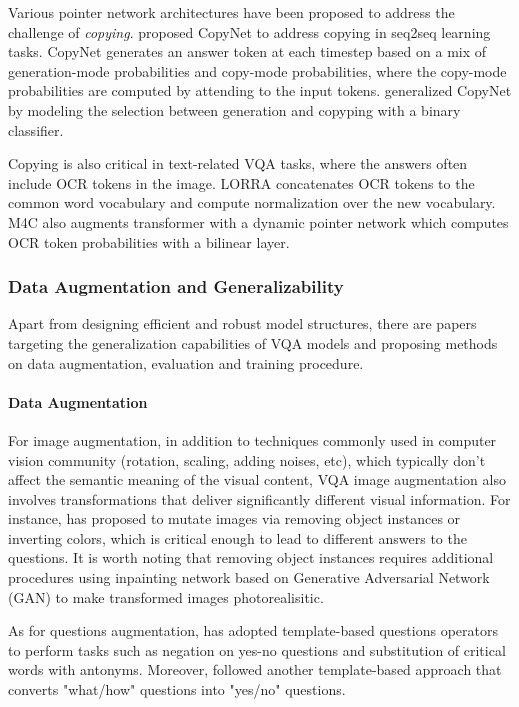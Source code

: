 \documentclass[11pt,a4paper]{article}
\begin{document}
Various pointer network \cite{vinyals2015pointer} architectures have been proposed to address the challenge of \textit{copying}. \citet{gu2016incorporating} proposed {CopyNet} to address copying in seq2seq learning tasks. {CopyNet} generates an answer token at each timestep based on a mix of generation-mode probabilities and copy-mode probabilities, where the copy-mode probabilities are computed by attending to the input tokens. \citet{see2017get} generalized CopyNet by modeling the selection between generation and copyping with a binary classifier. 

Copying is also critical in text-related VQA tasks, where the answers often include OCR tokens in the image. LORRA \cite{Singh_2019_CVPR} concatenates OCR tokens to the common word vocabulary and compute normalization over the new vocabulary. M4C \cite{hu2020iterative} also augments transformer with a dynamic pointer network which computes OCR token probabilities with a bilinear layer.


\subsubsection{Data Augmentation and Generalizability}
Apart from designing efficient and robust model structures, there are papers targeting the generalization capabilities of VQA models and proposing methods on data augmentation, evaluation and training procedure.

\paragraph{Data Augmentation}
For image augmentation, in addition to techniques commonly used in computer vision community (rotation, scaling, adding noises, etc), which typically don't affect the semantic meaning of the visual content, VQA image augmentation also involves transformations that deliver significantly different visual information. For instance, \citet{mutant} has proposed to mutate images via removing object instances or inverting colors, which is critical enough to lead to different answers to the questions. It is worth noting that removing object instances requires additional procedures using inpainting network based on Generative Adversarial Network (GAN) to make transformed images photorealisitic.  

As for questions augmentation, \citet{mutant} has adopted template-based questions operators to perform tasks such as negation on yes-no questions and substitution of critical words with antonyms. Moreover, \citet{RAD} followed another template-based approach that converts "what/how" questions into "yes/no" questions.  
\end{document}
